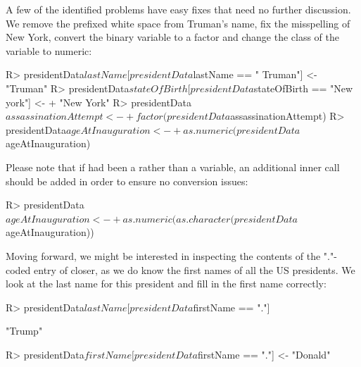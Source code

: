 \documentclass[article,shortnames]{jss}
\begin{document}
A few of the identified problems have easy fixes that need no further discussion. We remove the prefixed white space from Truman's name, fix the misspelling of New York, convert the binary variable  to a factor and change the class of the  variable to numeric:

\begin{Schunk}
\begin{Sinput}
R> presidentData$lastName[presidentData$lastName == " Truman"] <- "Truman"
R> presidentData$stateOfBirth[presidentData$stateOfBirth == "New york"] <- 
+    "New York"
R> presidentData$assassinationAttempt <- 
+    factor(presidentData$assassinationAttempt)
R> presidentData$ageAtInauguration <- 
+    as.numeric(presidentData$ageAtInauguration)
\end{Sinput}
\end{Schunk}

Please note that if  had been a  rather than a  variable, an additional inner call should be added in order to ensure no conversion issues:

\begin{Schunk}
\begin{Sinput}
R> presidentData$ageAtInauguration <- 
+    as.numeric(as.character(presidentData$ageAtInauguration))
\end{Sinput}
\end{Schunk}

Moving forward, we might be interested in inspecting the contents of the "."-coded entry of  closer, as we do know the first names of all the US presidents. We look at the last name for this president and fill in the first name correctly:

\begin{Schunk}
\begin{Sinput}
R> presidentData$lastName[presidentData$firstName == "."]
\end{Sinput}
\begin{Soutput}
[1] "Trump"
\end{Soutput}
\end{Schunk}

\begin{Schunk}
\begin{Sinput}
R> presidentData$firstName[presidentData$firstName == "."] <- "Donald"
\end{Sinput}
\end{Schunk}
\end{document}

